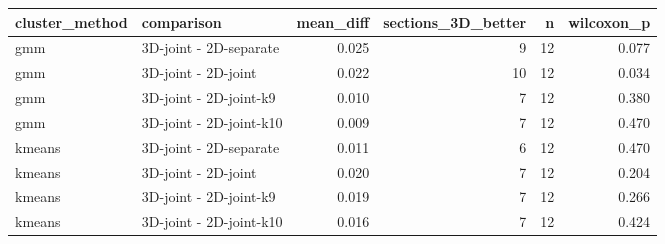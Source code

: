\begin{tabular}{llrrrr}
\toprule
cluster_method & comparison & mean_diff & sections_3D_better & n & wilcoxon_p \\
\midrule
gmm & 3D-joint - 2D-separate & 0.025 & 9 & 12 & 0.077 \\
gmm & 3D-joint - 2D-joint & 0.022 & 10 & 12 & 0.034 \\
gmm & 3D-joint - 2D-joint-k9 & 0.010 & 7 & 12 & 0.380 \\
gmm & 3D-joint - 2D-joint-k10 & 0.009 & 7 & 12 & 0.470 \\
kmeans & 3D-joint - 2D-separate & 0.011 & 6 & 12 & 0.470 \\
kmeans & 3D-joint - 2D-joint & 0.020 & 7 & 12 & 0.204 \\
kmeans & 3D-joint - 2D-joint-k9 & 0.019 & 7 & 12 & 0.266 \\
kmeans & 3D-joint - 2D-joint-k10 & 0.016 & 7 & 12 & 0.424 \\
\bottomrule
\end{tabular}
